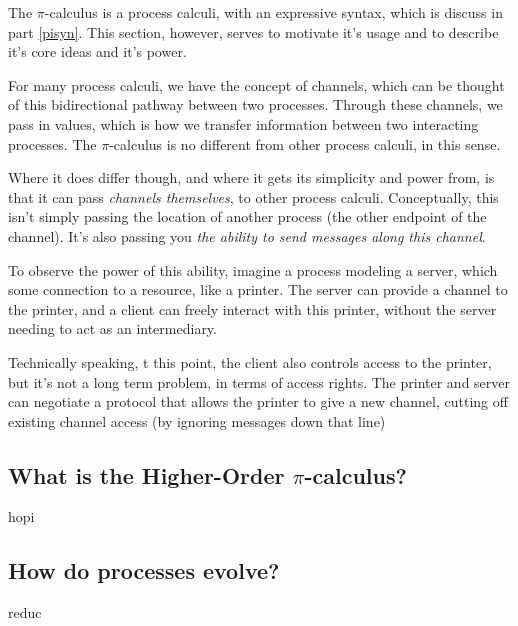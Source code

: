 The $\pi$-calculus is a process calculi, with an expressive syntax, which is discuss in part \ref{pisyn}. This section, however, serves to motivate it's usage and to describe it's core ideas and it's power.

For many process calculi, we have the concept of channels, which can be thought of this bidirectional pathway between two processes. Through these channels, we pass in values, which is how we transfer information between two interacting processes. The $\pi$-calculus is no different from other process calculi, in this sense.

Where it does differ though, and where it gets its simplicity and power from, is that it can pass \textit{channels themselves}, to other process calculi. Conceptually, this isn't simply passing the location of another process (the other endpoint of the channel). It's also passing you \textit{the ability to send messages along this channel}.

To observe the power of this ability, imagine a process modeling a server, which some connection to a resource, like a printer. The server can provide a channel to the printer, and a client can freely interact with this printer, without the server needing to act as an intermediary. 

Technically speaking, t this point, the client also controls access to the printer, but it's not a long term problem, in terms of access rights. The printer and server can negotiate a protocol that allows the printer to give a new channel, cutting off existing channel access (by ignoring messages down that line)

\subsection{What is the Higher-Order \texorpdfstring{$\pi$}{pi}-calculus?}
{hopi}

\subsection{How do processes evolve?}
{reduc}